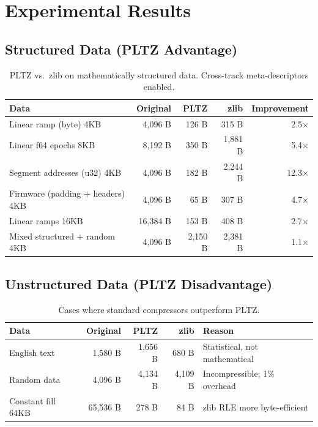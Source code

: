 \documentclass[11pt,a4paper]{article}
\begin{document}
\section{Experimental Results}

\subsection{Structured Data (PLTZ Advantage)}

\begin{table}[H]
\centering
\begin{tabular}{@{}lrrrr@{}}
\toprule
\textbf{Data} & \textbf{Original} & \textbf{PLTZ} & \textbf{zlib} & \textbf{Improvement} \\
\midrule
Linear ramp (byte) 4KB & 4,096 B & 126 B & 315 B & 2.5$\times$ \\
Linear f64 epochs 8KB & 8,192 B & 350 B & 1,881 B & 5.4$\times$ \\
Segment addresses (u32) 4KB & 4,096 B & 182 B & 2,244 B & 12.3$\times$ \\
Firmware (padding + headers) 4KB & 4,096 B & 65 B & 307 B & 4.7$\times$ \\
Linear ramps 16KB & 16,384 B & 153 B & 408 B & 2.7$\times$ \\
Mixed structured + random 4KB & 4,096 B & 2,150 B & 2,381 B & 1.1$\times$ \\
\bottomrule
\end{tabular}
\caption{PLTZ vs.\ zlib on mathematically structured data. Cross-track meta-descriptors enabled.}
\end{table}

\subsection{Unstructured Data (PLTZ Disadvantage)}

\begin{table}[H]
\centering
\begin{tabular}{@{}lrrrl@{}}
\toprule
\textbf{Data} & \textbf{Original} & \textbf{PLTZ} & \textbf{zlib} & \textbf{Reason} \\
\midrule
English text & 1,580 B & 1,656 B & 680 B & Statistical, not mathematical \\
Random data & 4,096 B & 4,134 B & 4,109 B & Incompressible; 1\% overhead \\
Constant fill 64KB & 65,536 B & 278 B & 84 B & zlib RLE more byte-efficient \\
\bottomrule
\end{tabular}
\caption{Cases where standard compressors outperform PLTZ.}
\end{table}
\end{document}
